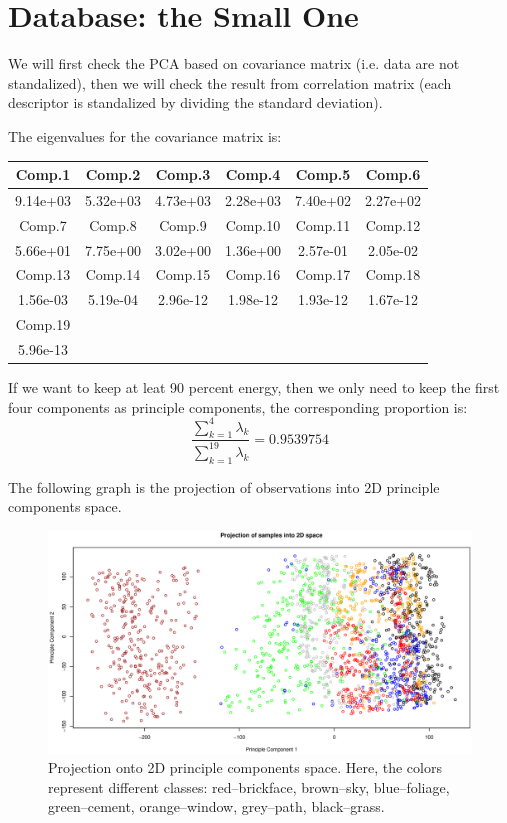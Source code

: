 \documentclass{article}
\begin{document}
\goodbreak

\section{Database: the Small One}

We will first check the PCA based on covariance matrix (i.e. data are not standalized), then we will check the result from correlation matrix (each
descriptor is standalized by dividing the standard deviation).

The eigenvalues for the covariance matrix is:

 \begin{tabular}{|c|c|c|c|c|c|}
  \hline
  Comp.1 & Comp.2 & Comp.3 & Comp.4 & Comp.5 & Comp.6 \\ \hline
  9.14e+03 & 5.32e+03 & 4.73e+03 & 2.28e+03 & 7.40e+02 & 2.27e+02 \\ \hline
  Comp.7 & Comp.8 & Comp.9 & Comp.10 & Comp.11 & Comp.12 \\ \hline
  5.66e+01 & 7.75e+00 & 3.02e+00 & 1.36e+00 & 2.57e-01 & 2.05e-02 \\ \hline
  Comp.13 & Comp.14 & Comp.15 & Comp.16 & Comp.17 & Comp.18 \\ \hline
  1.56e-03 & 5.19e-04 & 2.96e-12 & 1.98e-12 & 1.93e-12 & 1.67e-12 \\ \hline
  Comp.19 & & & & & \\ \hline
  5.96e-13 & & & & & \\ \hline
 \end{tabular}
 
If we want to keep at leat 90 percent energy, then we only need to keep the first four components as principle components, the corresponding 
proportion is:
\begin{equation}
 \frac{\sum_{k=1}^{4}\lambda_{k}}{\sum_{k=1}^{19}\lambda_{k}} = 0.9539754
\end{equation}

The following graph is the projection of observations into 2D principle components space.

\begin{figure}[htp]
\centering
\includegraphics[width=12.1cm]{small_pca_projection_2D.eps}
\caption{Projection onto 2D principle components space. Here, the colors represent different classes: red--brickface, brown--sky, blue--foliage,
green--cement, orange--window, grey--path, black--grass.}
\end{figure}
\end{document}
